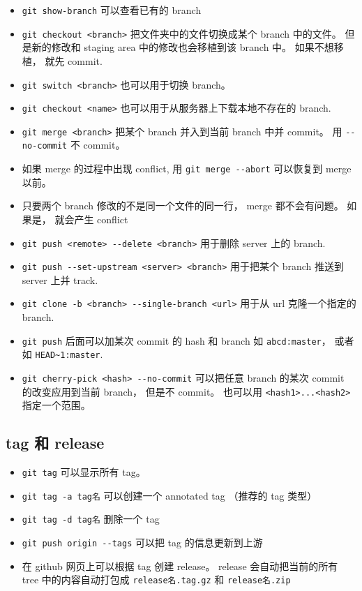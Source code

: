 \begin{itemize}
\item \verb|git show-branch| 可以查看已有的 branch 
\item \verb|git checkout <branch>| 把文件夹中的文件切换成某个 branch 中的文件。 但是新的修改和 staging area 中的修改也会移植到该 branch 中。 如果不想移植， 就先 commit.
\item \verb|git switch <branch>| 也可以用于切换 branch。
\item \verb|git checkout <name>| 也可以用于从服务器上下载本地不存在的 branch.
\item \verb|git merge <branch>| 把某个 branch 并入到当前 branch 中并 commit。 用 \verb|--no-commit| 不 commit。
\item 如果 merge 的过程中出现 conflict, 用 \verb|git merge --abort| 可以恢复到 merge 以前。
\item 只要两个 branch 修改的不是同一个文件的同一行， merge 都不会有问题。 如果是， 就会产生 conflict



\item \verb|git push <remote> --delete <branch>| 用于删除 server 上的 branch.
\item \verb|git push --set-upstream <server> <branch>| 用于把某个 branch 推送到 server 上并 track.


\item \verb|git clone -b <branch> --single-branch <url>| 用于从 url 克隆一个指定的 branch.
\item \verb|git push| 后面可以加某次 commit 的 hash 和 branch 如 \verb|abcd:master|， 或者如 \verb|HEAD~1:master|.

\item \verb|git cherry-pick <hash> --no-commit| 可以把任意 branch 的某次 commit 的改变应用到当前 branch， 但是不 commit。 也可以用 \verb|<hash1>...<hash2>| 指定一个范围。
\end{itemize}

\subsection{tag 和 release}
\begin{itemize}
\item \verb|git tag| 可以显示所有 tag。
\item \verb|git tag -a tag名| 可以创建一个 annotated tag （推荐的 tag 类型）
\item \verb|git tag -d tag名| 删除一个 tag
\item \verb|git push origin --tags| 可以把 tag 的信息更新到上游
\item 在 github 网页上可以根据 tag 创建 release。 release 会自动把当前的所有 tree 中的内容自动打包成 \verb|release名.tag.gz| 和 \verb|release名.zip|
\end{itemize}
